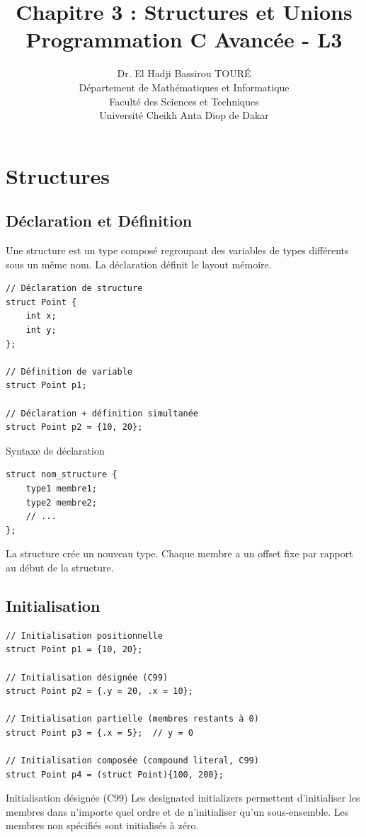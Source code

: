 \documentclass[10pt,a4paper]{article}
\title{\textbf{Chapitre 3 : Structures et Unions}\\
\large Programmation C Avancée - L3}
\author{Dr. El Hadji Bassirou TOURÉ\\
Département de Mathématiques et Informatique\\
Faculté des Sciences et Techniques\\
Université Cheikh Anta Diop de Dakar}
\date{}
\begin{document}
\maketitle

\section{Structures}

\subsection{Déclaration et Définition}

Une structure est un type composé regroupant des variables de types différents sous un même nom. La déclaration définit le layout mémoire.

\begin{lstlisting}
// Déclaration de structure
struct Point {
    int x;
    int y;
};

// Définition de variable
struct Point p1;

// Déclaration + définition simultanée
struct Point p2 = {10, 20};
\end{lstlisting}

\begin{definitionbox}{Syntaxe de déclaration}
\begin{lstlisting}
struct nom_structure {
    type1 membre1;
    type2 membre2;
    // ...
};
\end{lstlisting}
La structure crée un nouveau type. Chaque membre a un offset fixe par rapport au début de la structure.
\end{definitionbox}

\subsection{Initialisation}

\begin{lstlisting}
// Initialisation positionnelle
struct Point p1 = {10, 20};

// Initialisation désignée (C99)
struct Point p2 = {.y = 20, .x = 10};

// Initialisation partielle (membres restants à 0)
struct Point p3 = {.x = 5};  // y = 0

// Initialisation composée (compound literal, C99)
struct Point p4 = (struct Point){100, 200};
\end{lstlisting}

\begin{techbox}{Initialisation désignée (C99)}
Les designated initializers permettent d'initialiser les membres dans n'importe quel ordre et de n'initialiser qu'un sous-ensemble. Les membres non spécifiés sont initialisés à zéro.
\end{techbox}
\end{document}
